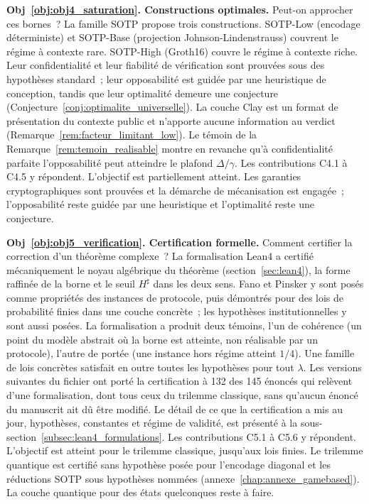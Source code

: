 \begin{sloppypar}
\textbf{Obj~\ref{obj:obj4_saturation}. Constructions optimales.} Peut-on approcher ces
bornes~? La famille SOTP propose trois constructions. SOTP-Low (encodage d\'eterministe) et
SOTP-Base (projection Johnson-Lindenstrauss) couvrent le r\'egime \`a contexte rare. SOTP-High (Groth16)
couvre le r\'egime \`a contexte riche. Leur
confidentialit\'e et leur fiabilit\'e de v\'erification sont prouv\'ees sous
des hypoth\`eses standard~; leur opposabilit\'e est guid\'ee par une heuristique
de conception, tandis que leur optimalit\'e demeure une conjecture
(Conjecture~\ref{conj:optimalite_universelle}). La couche Clay est un format de
pr\'esentation du contexte public et n'apporte aucune information au verdict
(Remarque~\ref{rem:facteur_limitant_low}). Le t\'emoin de la
Remarque~\ref{rem:temoin_realisable} montre en revanche qu'\`a confidentialit\'e parfaite
l'opposabilit\'e peut atteindre le plafond $\Delta/\gamma$. Les contributions C4.1 \`a C4.5
y r\'epondent. L'objectif est partiellement atteint. Les garanties cryptographiques sont
prouv\'ees et la d\'emarche de m\'ecanisation est engag\'ee~; l'opposabilit\'e reste guid\'ee par
une heuristique et l'optimalit\'e reste une conjecture.

\textbf{Obj~\ref{obj:obj5_verification}. Certification formelle.} Comment certifier la
correction d'un th\'eor\`eme complexe~? La formalisation Lean4 a
certifi\'e m\'ecaniquement le noyau alg\'ebrique du th\'eor\`eme
(section~\ref{sec:lean4}), la forme raffin\'ee de la borne et le seuil $H^\sharp$ dans
les deux sens. Fano et
Pinsker y sont pos\'es comme propri\'et\'es des instances de protocole, puis
d\'emontr\'es pour des lois de probabilit\'e finies dans une couche concr\`ete~; les
hypoth\`eses institutionnelles y sont aussi pos\'ees. La formalisation a produit
deux t\'emoins, l'un de coh\'erence (un point du mod\`ele abstrait o\`u la
borne est atteinte, non r\'ealisable par un protocole), l'autre de port\'ee
(une instance hors r\'egime atteint $1/4$). Une famille de lois concr\`etes satisfait
en outre toutes les hypoth\`eses pour tout $\lambda$. Les versions suivantes du fichier ont port\'e la
certification \`a 132 des 145 \'enonc\'es qui rel\`event d'une formalisation, dont tous ceux du trilemme
classique, sans qu'aucun \'enonc\'e du manuscrit ait d\^u \^etre modifi\'e. Le d\'etail de ce que la certification a mis au jour, hypoth\`eses,
constantes et r\'egime de validit\'e, est pr\'esent\'e \`a la
sous-section~\ref{subsec:lean4_formulations}. Les contributions C5.1 \`a C5.6 y r\'epondent.
L'objectif est atteint pour le trilemme classique, jusqu'aux lois finies. Le trilemme quantique est
certifi\'e sans hypoth\`ese pos\'ee pour l'encodage diagonal et les r\'eductions SOTP sous hypoth\`eses
nomm\'ees (annexe~\ref{chap:annexe_gamebased}). La couche quantique pour des \'etats quelconques reste \`a faire.


\end{sloppypar}
